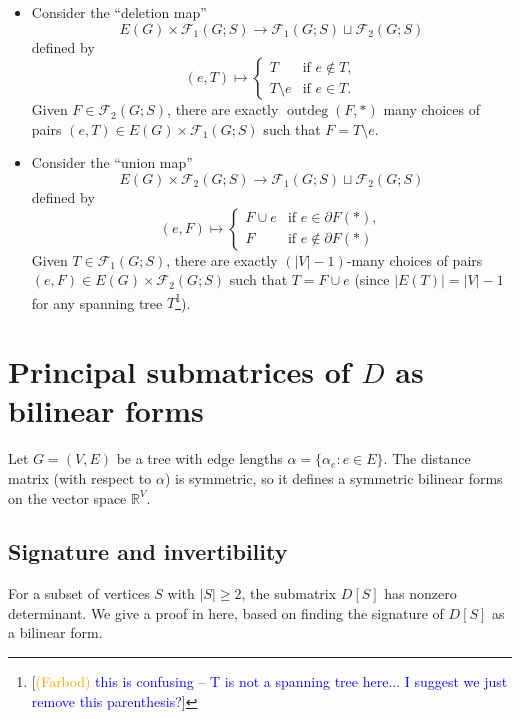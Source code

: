 \documentclass[12pt]{amsart}
\theoremstyle{definition}
\newcommand{\RR}{\mathbb{R}}
\newcommand{\trees}{\mathcal{F}_1}
\newcommand{\forests}{\mathcal{F}}
\DeclareMathOperator{\outdeg}{outdeg}
\newcommand\farbod[1]{\footnote{[\textcolor{orange}{(Farbod)} \textcolor{blue}{#1}]}}
\begin{document}
\begin{itemize}[leftmargin=*]
\item Consider the ``deletion map''
\[
	E(G) \times \trees(G;S) \to \trees(G;S) \sqcup \forests_2(G;S)
\]
defined by
\[
	(e, T) \mapsto \begin{cases}
	T &\text{if } e\not\in T,\\
	T \setminus e &\text{if } e\in T.
	\end{cases}
\]
Given $F \in \forests_2(G;S)$,
there are exactly $\outdeg(F, *)$ many choices of pairs $(e, T) \in E(G) \times \trees(G;S)$ such that $F = T \setminus e$.
\medskip
\item Consider the ``union map'' 
\[
	E(G) \times \forests_2(G;S) \longrightarrow \trees(G;S) \sqcup \forests_2(G;S)
\]
defined by
\[
	(e, F) \mapsto \begin{cases}
		F \cup e &\text{if } e \in \partial F(*), \\
		F &\text{if } e \not\in \partial F(*)
	\end{cases}
\]
Given $T \in \trees(G; S)$,  
there are exactly $(|V| - 1)$-many choices of pairs $(e, F) \in E(G) \times \forests_2(G; S)$ such that $T = F \cup e$ (since $|E(T)| = |V| - 1$ for any spanning tree $T$\farbod{this is confusing -- T is not a spanning tree here... I suggest we just remove this parenthesis?}). 
\end{itemize}



\section{Principal submatrices of \texorpdfstring{$D$}{D} as bilinear forms}
\label{sec:distance_prelim}

Let $G=(V, E)$ be a tree with edge lengths $\alpha = \{\alpha_e \colon e\in E\}$. The {distance matrix} (with respect to $\alpha$) is symmetric, so it defines a symmetric bilinear forms on the vector space $\RR^V$.

\subsection{Signature and invertibility}\label{sec:signature}

For a subset of vertices $S$ with $|S| \geq 2$, the submatrix $D[S]$ has nonzero determinant. 
We give a proof in here, based on finding the signature of $D[S]$ as a bilinear form.
\end{document}
